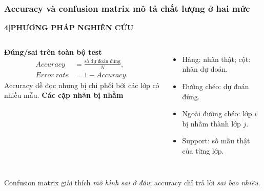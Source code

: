 \documentclass[aspectratio=169,12pt]{beamer}
\newcommand{\chaptertag}[2]{%
  \vspace{-0.16cm}%
  {\scriptsize\bfseries\textcolor{boxframe}{#1\enspace |\enspace #2}}\par
  \vspace{0.12cm}%
}
\begin{document}
\begin{frame}
  \frametitle{Accuracy và confusion matrix mô tả chất lượng ở hai mức}
  \chaptertag{4}{PHƯƠNG PHÁP NGHIÊN CỨU}
  \small
  \begin{columns}[T,onlytextwidth]
      \textbf{Đúng/sai trên toàn bộ test}
      \begin{align*}
        Accuracy &= \frac{\text{số dự đoán đúng}}{N},\\
        Error\ rate &= 1-Accuracy.
      \end{align*}
      Accuracy dễ đọc nhưng bị chi phối bởi các lớp có nhiều mẫu.
      \textbf{Các cặp nhãn bị nhầm}
      \begin{itemize}
        \item Hàng: nhãn thật; cột: nhãn dự đoán.
        \item Đường chéo: dự đoán đúng.
        \item Ngoài đường chéo: lớp $i$ bị nhầm thành lớp $j$.
        \item Support: số mẫu thật của từng lớp.
      \end{itemize}
  \end{columns}
  \vspace{0.24cm}
  \begin{tcolorbox}[focusbox,width=0.93\textwidth,top=2mm,bottom=2mm]
    \centering
    Confusion matrix giải thích \textit{mô hình sai ở đâu}; accuracy chỉ trả lời \textit{sai bao nhiêu}.
  \end{tcolorbox}
\end{frame}
\end{document}
